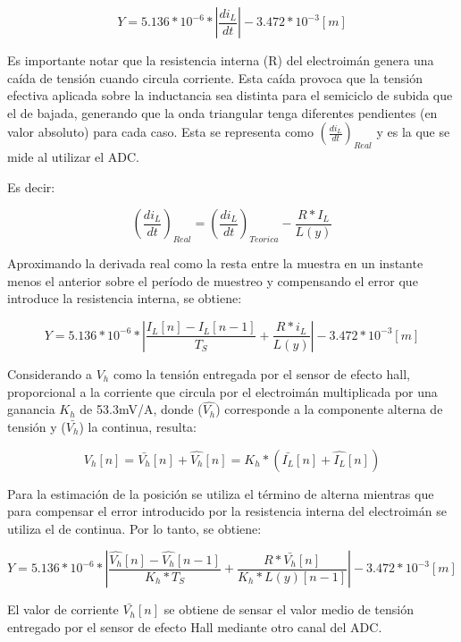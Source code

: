 \begin{equation} 
	Y = 5.136*10^{-6}*|\frac{di_L}{dt}|- 3.472*10^{-3} [m]
\end{equation}

\noindent Es importante notar que la resistencia interna (R) del electroimán genera una caída de tensión cuando circula corriente. Esta caída provoca que la tensión efectiva aplicada sobre la inductancia sea distinta para el semiciclo de subida que el de bajada, generando que la onda triangular tenga diferentes pendientes (en valor absoluto) para cada caso. Esta se representa como $(\frac{di_L}{dt})_{Real}$ y es la que se mide al utilizar el ADC.

\noindent Es decir:

\begin{equation} 
	(\frac{di_L}{dt})_{Real}=(\frac{di_L}{dt})_{Teorica}-\frac{R*I_L}{L(y)}
\end{equation}

\noindent Aproximando la derivada real como la resta entre la muestra en un instante menos el anterior sobre el período de muestreo y compensando el error que introduce la resistencia interna, se obtiene:

\begin{equation} 
	Y = 5.136*10^{-6}* |\frac{I_L[n]-I_L[n-1]}{T_S}+\frac{R*i_L}{L(y)}| - 3.472*10^{-3} [m]
\end{equation}


\noindent Considerando a $V_h$ como la tensión entregada por el sensor de efecto hall, proporcional a la corriente que circula por el electroimán multiplicada por una ganancia $K_h$ de 53.3mV/A, donde  ($\hat{V_h}$)  corresponde a la componente alterna de tensión y ($\bar{V_h}$) la continua, resulta:


\begin{equation} 
	V_h[n] = \bar{V_h}[n] + \hat{V_h}[n] = K_h * (\bar{I_L}[n] + \hat{I_L}[n])
\end{equation}

\noindent Para la estimación de la posición se utiliza el término de alterna mientras que para compensar el error introducido por la resistencia interna del electroimán se utiliza el de continua. Por lo tanto, se obtiene:

\begin{equation}
	Y = 5.136*10^{-6}*|\frac{\hat{V_h}[n]-\hat{V_h}[n-1]}{K_h*T_S} + \frac{R*\bar{V_h}[n]}{K_h*L(y)[n-1]}|-3.472*10^{-3}[m]
\end{equation}

\noindent El valor de corriente $\bar{V_h}[n]$ se obtiene de sensar el valor medio de tensión entregado por el sensor de efecto Hall mediante otro canal del ADC.

